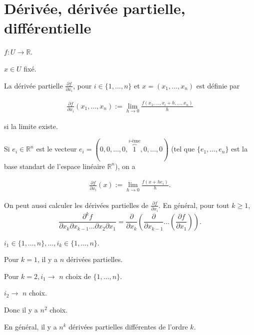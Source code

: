 \documentclass[french]{article}
\theoremstyle{definition}
\theoremstyle{remark}
\begin{document}
\section{Dérivée, dérivée partielle, différentielle}

$ f : U \to \mathbb{R}$.

$x \in U$ fixé.

La dérivée partielle $\frac{\partial f }{\partial x_i} $, pour $ i \in \{ 1, \dots, n \} $ et $x = (x_1, \dots, x_n)$ est définie par

\begin{gather*}
  \frac{\partial f }{\partial x_i} (x_1, \dots, x_n) := \lim_{h \to 0} \frac{f(x_1, \dots, x_i + h, \dots, x_n)}{h}
\end{gather*}

si la limite existe.

Si $e_i \in \mathbb{R}^n$ est le vecteur $e_i = (0,0,  \dots, 0, \overbrace{1}^{i\text{-ème}}, 0, \dots, 0)$ (tel que $\{ e_1, \dots, e_n \} $ est la base standart de l'espace linéaire $\mathbb{R}^n$), on a

\begin{gather*}
  \frac{\partial f }{\partial x_i }(x) := \lim_{h \to 0} \frac{f(x+h e_i)}{h}  .
\end{gather*}

On peut aussi calculer les dérivées partielles de $\frac{\partial f }{\partial x_i} $. En général, pour tout $k \geq 1$, $$ \frac{\partial ^{k} f }{\partial x_k \partial x _{k-1} \dots \partial x_2 \partial x_1 }  = \frac{\partial  }{\partial x_k } \left(\frac{\partial  }{\partial x _{k-1} } \dots \left(\frac{\partial f }{\partial x_1} \right) \right) .$$

$i_1 \in \{ 1, \dots, n \}, \dots, i_k \in \{ 1, \dots, n \} $.

Pour $k=1$, il y a $n$ dérivées partielles.

Pour $k=2, i_1 \longrightarrow$ $n$ choix de $\{ 1, \dots, n \} $.

$i_2 \longrightarrow $ $n$ choix.

Donc il y a $n ^2$ choix.

En général, il y a $n ^{k}$ dérivées partielles différentes de l'ordre $k$.
\end{document}
